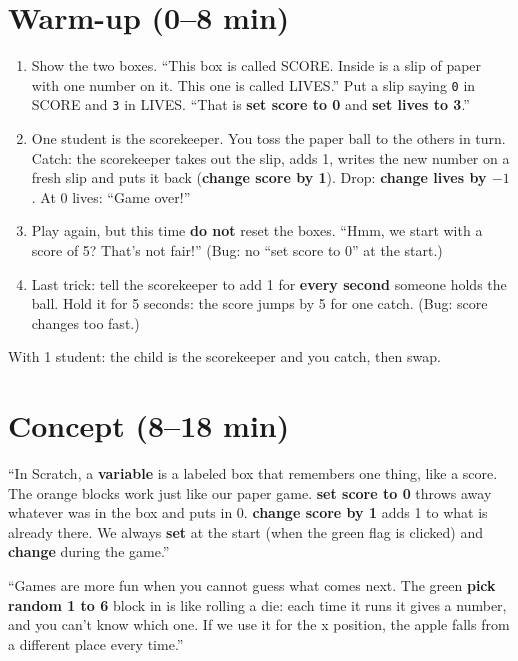 \section{Warm-up (0--8 min)}
\begin{unplugged}
\begin{enumerate}[leftmargin=1.4em,itemsep=1pt]
  \item Show the two boxes. \enquote{This box is called SCORE. Inside is a slip of paper with one number on it. This one is called LIVES.} Put a slip saying \texttt{0} in SCORE and \texttt{3} in LIVES. \enquote{That is \textbf{set score to 0} and \textbf{set lives to 3}.}
  \item One student is the scorekeeper. You toss the paper ball to the others in turn. Catch: the scorekeeper takes out the slip, adds 1, writes the new number on a fresh slip and puts it back (\textbf{change score by 1}). Drop: \textbf{change lives by $-1$}. At 0 lives: \enquote{Game over!}
  \item Play again, but this time \textbf{do not} reset the boxes. \enquote{Hmm, we start with a score of 5? That's not fair!} (Bug: no \enquote{set score to 0} at the start.)
  \item Last trick: tell the scorekeeper to add 1 for \textbf{every second} someone holds the ball. Hold it for 5 seconds: the score jumps by 5 for one catch. (Bug: score changes too fast.)
\end{enumerate}
With 1 student: the child is the scorekeeper and you catch, then swap.
\end{unplugged}

\section{Concept (8--18 min)}
\begin{teacherscript}
\enquote{In Scratch, a \textbf{variable} is a labeled box that remembers one thing, like a score. The orange  blocks work just like our paper game. \textbf{set score to 0} throws away whatever was in the box and puts in 0. \textbf{change score by 1} adds 1 to what is already there. We always \textbf{set} at the start (when the green flag is clicked) and \textbf{change} during the game.}

\enquote{Games are more fun when you cannot guess what comes next. The green \textbf{pick random 1 to 6} block in  is like rolling a die: each time it runs it gives a number, and you can't know which one. If we use it for the x position, the apple falls from a different place every time.}
\end{teacherscript}

